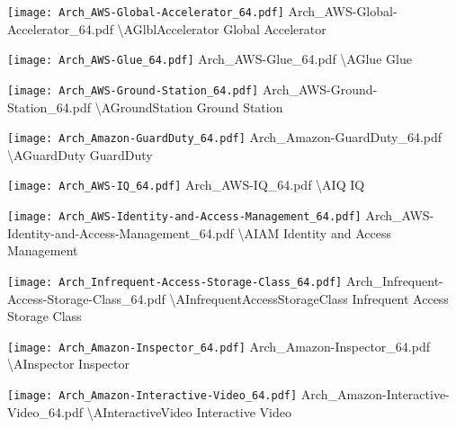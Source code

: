  {\texttt{[image: Arch\_AWS-Global-Accelerator\_64.pdf]}} {Arch\_AWS-Global-Accelerator\_64.pdf} {{\textbackslash}AGlblAccelerator} {Global Accelerator}

 {\texttt{[image: Arch\_AWS-Glue\_64.pdf]}} {Arch\_AWS-Glue\_64.pdf} {{\textbackslash}AGlue} {Glue}

 {\texttt{[image: Arch\_AWS-Ground-Station\_64.pdf]}} {Arch\_AWS-Ground-Station\_64.pdf} {{\textbackslash}AGroundStation} {Ground Station}

 {\texttt{[image: Arch\_Amazon-GuardDuty\_64.pdf]}} {Arch\_Amazon-GuardDuty\_64.pdf} {{\textbackslash}AGuardDuty} {GuardDuty}

 {\texttt{[image: Arch\_AWS-IQ\_64.pdf]}} {Arch\_AWS-IQ\_64.pdf} {{\textbackslash}AIQ} {IQ}

 {\texttt{[image: Arch\_AWS-Identity-and-Access-Management\_64.pdf]}} {Arch\_AWS-Identity-and-Access-Management\_64.pdf} {{\textbackslash}AIAM} {Identity and Access Management}

 {\texttt{[image: Arch\_Infrequent-Access-Storage-Class\_64.pdf]}} {Arch\_Infrequent-Access-Storage-Class\_64.pdf} {{\textbackslash}AInfrequentAccessStorageClass} {Infrequent Access Storage Class}

 {\texttt{[image: Arch\_Amazon-Inspector\_64.pdf]}} {Arch\_Amazon-Inspector\_64.pdf} {{\textbackslash}AInspector} {Inspector}

 {\texttt{[image: Arch\_Amazon-Interactive-Video\_64.pdf]}} {Arch\_Amazon-Interactive-Video\_64.pdf} {{\textbackslash}AInteractiveVideo} {Interactive Video}

